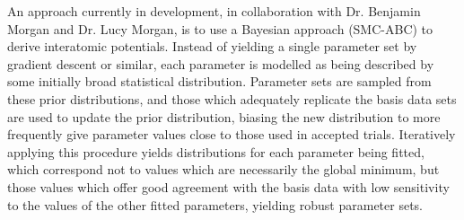 An approach currently in development, in collaboration with Dr. Benjamin Morgan and Dr. Lucy Morgan, is to use a Bayesian approach (SMC-ABC\cite{Toni2009a}) to derive interatomic potentials.
Instead of yielding a single parameter set by gradient descent or similar, each parameter is modelled as being described by some initially broad statistical distribution.
Parameter sets are sampled from these prior distributions, and those which adequately replicate the basis data sets are used to update the prior distribution, biasing the new distribution to more frequently give parameter values close to those used in accepted trials.
Iteratively applying this procedure yields distributions for each parameter being fitted, which correspond not to values which are necessarily the global minimum, but those values which offer good agreement with the basis data with low sensitivity to the values of the other fitted parameters, yielding robust parameter sets.

